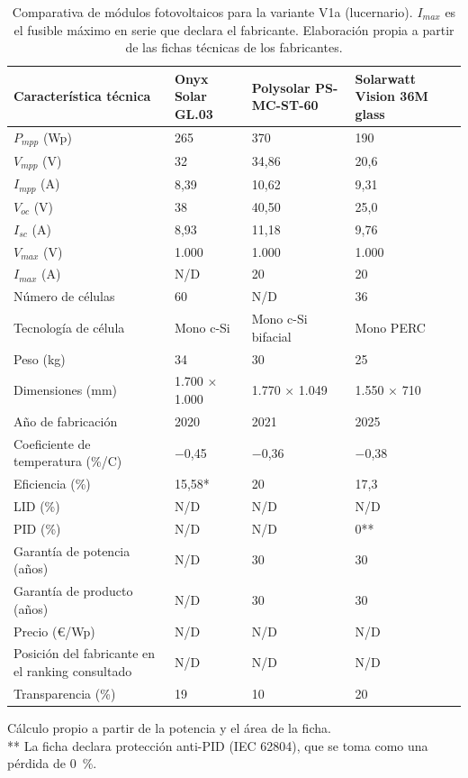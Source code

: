 \begin{table}[htbp]
    \centering
    \caption{Comparativa de módulos fotovoltaicos para la variante V1a (lucernario). $I_{max}$ es el fusible máximo en serie que declara el fabricante. Elaboración propia a partir de las fichas técnicas de los fabricantes.}
    \label{tab:diseno-modulos-v1a}
    \footnotesize
    \renewcommand{\arraystretch}{1.15}
    \begin{tabularx}{\textwidth}{|F{4.2cm}|Y|Y|Y|}
        \hline
        \textbf{Característica técnica} & \textbf{Onyx Solar GL.03} & \textbf{Polysolar PS-MC-ST-60} & \textbf{Solarwatt Vision 36M glass} \\
        \hline
        $P_{mpp}$ (Wp) & 265 & 370 & 190 \\
        \hline
        $V_{mpp}$ (V) & 32 & 34,86 & 20,6 \\
        \hline
        $I_{mpp}$ (A) & 8,39 & 10,62 & 9,31 \\
        \hline
        $V_{oc}$ (V) & 38 & 40,50 & 25,0 \\
        \hline
        $I_{sc}$ (A) & 8,93 & 11,18 & 9,76 \\
        \hline
        $V_{max}$ (V) & 1.000 & 1.000 & 1.000 \\
        \hline
        $I_{max}$ (A) & N/D & 20 & 20 \\
        \hline
        Número de células & 60 & N/D & 36 \\
        \hline
        Tecnología de célula & Mono c-Si & Mono c-Si bifacial & Mono PERC \\
        \hline
        Peso (kg) & 34 & 30 & 25 \\
        \hline
        Dimensiones (mm) & 1.700 × 1.000 & 1.770 × 1.049 & 1.550 × 710 \\
        \hline
        Año de fabricación & 2020 & 2021 & 2025 \\
        \hline
        Coeficiente de temperatura (\%/\textdegree{}C) & $-$0,45 & $-$0,36 & $-$0,38 \\
        \hline
        Eficiencia (\%) & 15,58* & 20 & 17,3 \\
        \hline
        \acs{LID} (\%) & N/D & N/D & N/D \\
        \hline
        PID (\%) & N/D & N/D & 0** \\
        \hline
        Garantía de potencia (años) & N/D & 30 & 30 \\
        \hline
        Garantía de producto (años) & N/D & 30 & 30 \\
        \hline
        Precio (€/Wp) & N/D & N/D & N/D \\
        \hline
        Posición del fabricante en el ranking consultado & N/D & N/D & N/D \\
        \hline
        Transparencia (\%) & 19 & 10 & 20 \\
        \hline
    \end{tabularx}

    \smallskip
    {\scriptsize * Cálculo propio a partir de la potencia y el área de la ficha.\\ ** La ficha declara protección anti-PID (IEC 62804), que se toma como una pérdida de 0~\%.}
\end{table}

